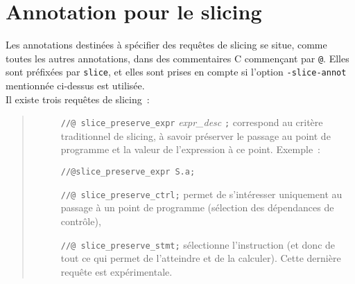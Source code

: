 \section{Annotation pour le slicing}

Les annotations destinées à spécifier des requêtes
de slicing se situe, comme toutes les autres annotations, dans des commentaires
C commençant par \verb!@!. Elles sont préfixées par \verb!slice!,
et elles sont prises en compte si l'option \verb!-slice-annot! mentionnée
ci-dessus est utilisée.\\

Il existe trois requêtes de slicing~:
\begin{quote}
\begin{description}
  \item[]\verb!//@ slice_preserve_expr! {\it expr\_desc} \verb!;!
    correspond au critère traditionnel de slicing, à savoir préserver le passage
    au point de programme et la valeur de l'expression à ce point. Exemple~:
    \begin{center}
    \verb!//@slice_preserve_expr S.a;!
    \end{center}
  \item[]\verb!//@ slice_preserve_ctrl;!
    permet de s'intéresser uniquement au passage à un point de programme 
    (sélection des dépendances de contrôle),
  \item[]\verb!//@ slice_preserve_stmt;!
    sélectionne l'instruction (et donc de tout ce qui permet de l'atteindre et
    de la calculer).
    Cette dernière requête est expérimentale.
\end{description}
\end{quote}
